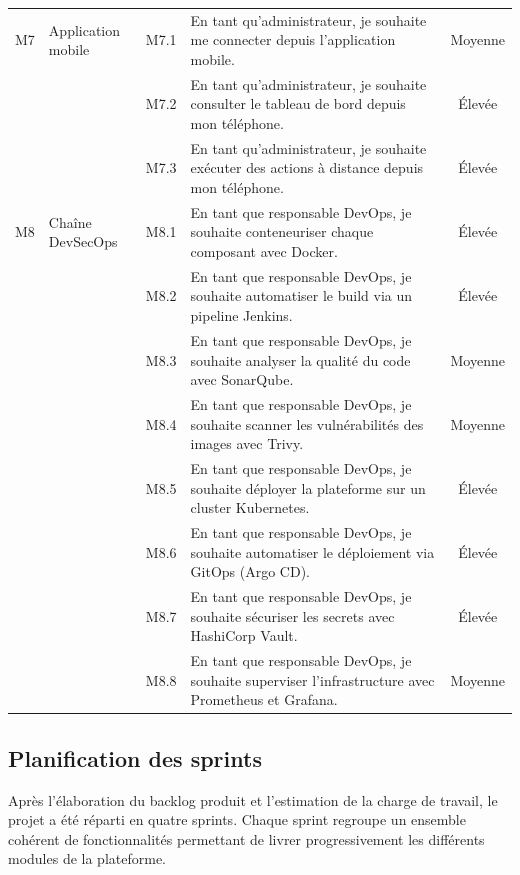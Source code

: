 \begin{longtable}{|c|>{\raggedright\arraybackslash}p{2.6cm}|c|>{\raggedright\arraybackslash}p{6.2cm}|c|}
M7 & Application mobile
& M7.1 & En tant qu'administrateur, je souhaite me connecter depuis l'application mobile. & Moyenne \\
& & M7.2 & En tant qu'administrateur, je souhaite consulter le tableau de bord depuis mon téléphone. & Élevée \\
& & M7.3 & En tant qu'administrateur, je souhaite exécuter des actions à distance depuis mon téléphone. & Élevée \\
\hline

M8 & Chaîne DevSecOps
& M8.1 & En tant que responsable DevOps, je souhaite conteneuriser chaque composant avec Docker. & Élevée \\
& & M8.2 & En tant que responsable DevOps, je souhaite automatiser le build via un pipeline Jenkins. & Élevée \\
& & M8.3 & En tant que responsable DevOps, je souhaite analyser la qualité du code avec SonarQube. & Moyenne \\
& & M8.4 & En tant que responsable DevOps, je souhaite scanner les vulnérabilités des images avec Trivy. & Moyenne \\
& & M8.5 & En tant que responsable DevOps, je souhaite déployer la plateforme sur un cluster Kubernetes. & Élevée \\
& & M8.6 & En tant que responsable DevOps, je souhaite automatiser le déploiement via GitOps (Argo CD). & Élevée \\
& & M8.7 & En tant que responsable DevOps, je souhaite sécuriser les secrets avec HashiCorp Vault. & Élevée \\
& & M8.8 & En tant que responsable DevOps, je souhaite superviser l'infrastructure avec Prometheus et Grafana. & Moyenne \\
\hline

\end{longtable}

\subsection{Planification des sprints}
Après l'élaboration du backlog produit et l'estimation de la charge de travail, le
projet a été réparti en quatre sprints. Chaque sprint regroupe un ensemble cohérent de
fonctionnalités permettant de livrer progressivement les différents modules de la
plateforme.

